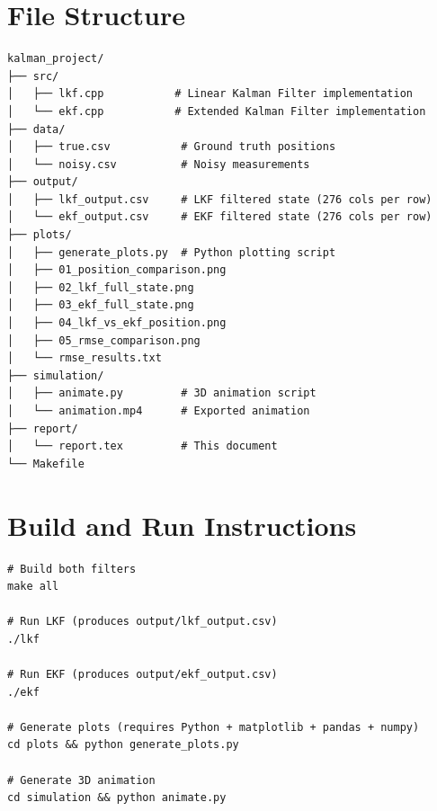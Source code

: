 \documentclass[12pt,a4paper]{article}
\begin{document}
\newpage
\appendix
\section{File Structure}

\begin{verbatim}
kalman_project/
├── src/
│   ├── lkf.cpp           # Linear Kalman Filter implementation
│   └── ekf.cpp           # Extended Kalman Filter implementation
├── data/
│   ├── true.csv           # Ground truth positions
│   └── noisy.csv          # Noisy measurements
├── output/
│   ├── lkf_output.csv     # LKF filtered state (276 cols per row)
│   └── ekf_output.csv     # EKF filtered state (276 cols per row)
├── plots/
│   ├── generate_plots.py  # Python plotting script
│   ├── 01_position_comparison.png
│   ├── 02_lkf_full_state.png
│   ├── 03_ekf_full_state.png
│   ├── 04_lkf_vs_ekf_position.png
│   ├── 05_rmse_comparison.png
│   └── rmse_results.txt
├── simulation/
│   ├── animate.py         # 3D animation script
│   └── animation.mp4      # Exported animation
├── report/
│   └── report.tex         # This document
└── Makefile
\end{verbatim}

\section{Build and Run Instructions}

\begin{verbatim}
# Build both filters
make all

# Run LKF (produces output/lkf_output.csv)
./lkf

# Run EKF (produces output/ekf_output.csv)
./ekf

# Generate plots (requires Python + matplotlib + pandas + numpy)
cd plots && python generate_plots.py

# Generate 3D animation
cd simulation && python animate.py
\end{verbatim}
\end{document}
